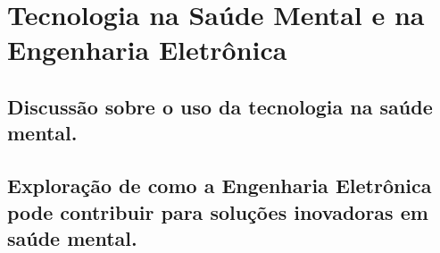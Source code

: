 \chapter{Tecnologia na Saúde Mental e na Engenharia Eletrônica}

\section{Discussão sobre o uso da tecnologia na saúde mental.}
\section{Exploração de como a Engenharia Eletrônica pode contribuir para soluções inovadoras em saúde mental.}
